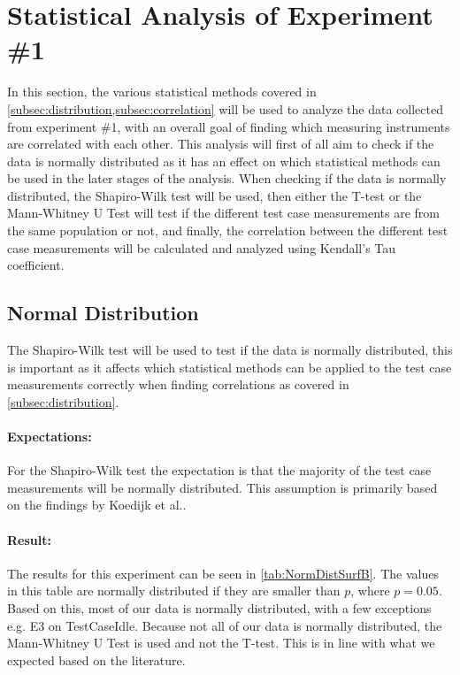 \section{Statistical Analysis of Experiment \#1}\label{sec:Stat1}

In this section, the various statistical methods covered in \cref{subsec:distribution,subsec:correlation} will be used to analyze the data collected from experiment \#1, with an overall goal of finding which measuring instruments are correlated with each other. This analysis will first of all aim to check if the data is normally distributed as it has an effect on which statistical methods can be used in the later stages of the analysis. When checking if the data is normally distributed, the Shapiro-Wilk test\cite{razali2011power} will be used, then either the T-test or the Mann-Whitney U Test\cite{mann1947test} will test if the different test case measurements are from the same population or not, and finally, the correlation between the different test case measurements will be calculated and analyzed using Kendall's Tau coefficient\cite{kendall1938new}.

\subsection{Normal Distribution}\label{subsec:NormalDist1}
The Shapiro-Wilk test will be used to test if the data is normally distributed, this is important as it affects which statistical methods can be applied to the test case measurements correctly when finding correlations as covered in \cref{subsec:distribution}. 

\paragraph{Expectations:} For the Shapiro-Wilk test the expectation is that the majority of the test case measurements will be normally distributed. This assumption is primarily based on the findings by Koedijk et al.\cite{Koedijk2022diff}.

\paragraph{Result:} The results for this experiment can be seen in \cref{tab:NormDistSurfB}. The values in this table are normally distributed if they are smaller than $p$, where $p = 0.05$\cite{wasserstein2019moving}. Based on this, most of our data is normally distributed, with a few exceptions e.g. E3 on TestCaseIdle. Because not all of our data is normally distributed, the Mann-Whitney U Test is used and not the T-test. This is in line with what we expected based on the literature.

